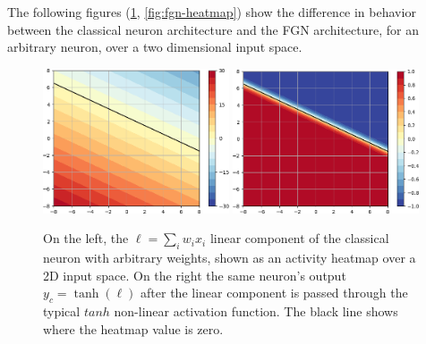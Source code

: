 \documentclass[12pt,oneside]{CUNY_PhD}
\begin{document}
The following figures (\ref{fig:classic-heatmap}, \ref{fig:fgn-heatmap}) show the difference in behavior between the classical neuron architecture and the FGN architecture, for an arbitrary neuron, over a two dimensional input space.
\begin{figure}[!t]
    \centering
    \includegraphics[width=0.49\textwidth]{images/2D Activity/2d-linear-activity-cropped.png}
    \includegraphics[width=0.49\textwidth]{images/2D Activity/2d-classic-activity-cropped.png}
    \caption{On the left, the $\ell = \sum_{i}w_i x_i$ linear component of the classical neuron with arbitrary weights, shown as an activity heatmap over a 2D input space. On the right the same neuron's output $y_c = \tanh(\ell)$  after the linear component is passed through the typical $tanh$ non-linear activation function. The black line shows where the heatmap value is zero.}
    \label{fig:classic-heatmap}
\end{figure}
\end{document}
